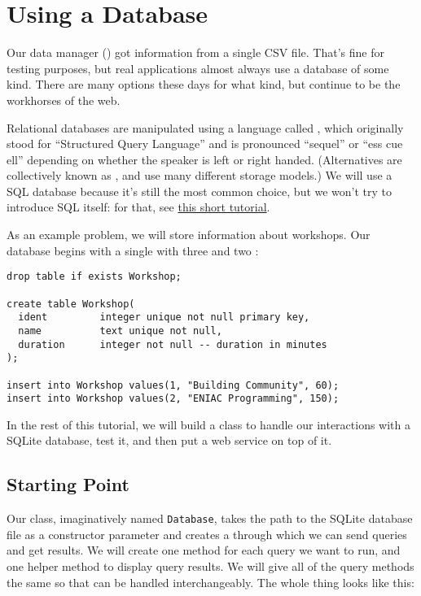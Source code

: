 \chapter{Using a Database}\label{s:db}

Our data manager () got information from a single CSV file.
That's fine for testing purposes,
but real applications almost always use a database of some kind.
There are many options these days for what kind,
but  continue to be
the workhorses of the web.

Relational databases are manipulated using a language called ,
which originally stood for ``Structured Query Language''
and is pronounced ``sequel'' or ``ess cue ell'' depending on whether the speaker is
left or right handed.
(Alternatives are collectively known as ,
and use many different storage models.)
We will use a SQL database because it's still the most common choice,
but we won't try to introduce SQL itself:
for that,
see \href{https://swcarpentry.github.io/sql-novice-survey/}{this short tutorial}.

As an example problem,
we will store information about workshops.
Our database begins with a single 
with three 
and two :

\begin{verbatim}
drop table if exists Workshop;

create table Workshop(
  ident         integer unique not null primary key,
  name          text unique not null,
  duration      integer not null -- duration in minutes
);

insert into Workshop values(1, "Building Community", 60);
insert into Workshop values(2, "ENIAC Programming", 150);
\end{verbatim}

In the rest of this tutorial,
we will build a class to handle our interactions with a SQLite database,
test it,
and then put a web service on top of it.

\section{Starting Point}\label{s:db-start}

Our class, imaginatively named \texttt{Database},
takes the path to the SQLite database file as a constructor parameter
and creates a 
through which we can send queries and get results.
We will create one method for each query we want to run,
and one helper method to display query results.
We will give all of the query methods the same 
so that can be handled interchangeably.
The whole thing looks like this:

